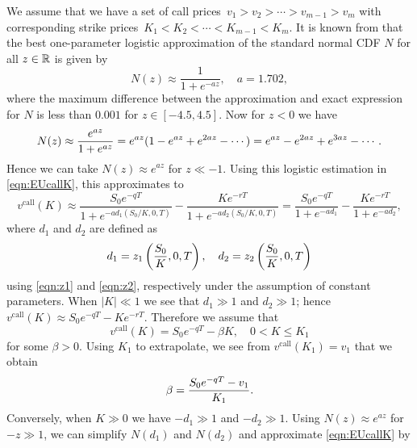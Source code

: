 We assume that we have a set of call prices~$v_1 > v_2 > \cdots > v_{m - 1} > v_m$ with corresponding strike prices~$K_1 < K_2 < \cdots < K_{m - 1} < K_m$. It is known from \cite{Bowling2009} that the best one-parameter logistic approximation of the standard normal CDF $N$ for all $z \in \mathbb R$ is given by
	\begin{equation*}
		N(z) \approx \frac{1}{1 + e^{-a z}}, \quad a = 1.702,
	\end{equation*}
where the maximum difference between the approximation and exact expression for $N$ is less than $0.001$ for $z \in [-4.5,4.5]$. %
Now for $z < 0$ we have
	\begin{equation*}
		N(z) \approx \frac{e^{az}}{1+e^{az}} = e^{az}(1-e^{az}+e^{2az}-\cdots) = e^{az} - e^{2az} + e^{3az} - \cdots.
	\end{equation*}
Hence we can take $N(z) \approx e^{az}$ for $z \ll -1$. Using this logistic estimation in \eqref{eqn:EUcallK}, this approximates to
	\begin{equation*}
		v^{\text{call}}(K) \approx \frac{S_0 e^{-q T}}{1 + e^{-a d_1(S_0/K,0,T)}} - \frac{K e^{-r T}}{1 + e^		{-a d_2(S_0/K,0,T)}} = \frac{S_0 e^{-q T}}{1 + e^{-a d_1}} - \frac{K e^{-r T}}{1 + e^		{-a d_2}},
	\end{equation*}
where $d_1$ and $d_2$ are defined as
	\begin{equation*}
		d_1 = z_1\left( \frac{S_0}{K},0,T \right), \quad d_2 = z_2\left( \frac{S_0}{K}, 0, T\right)
	\end{equation*}
using \eqref{eqn:z1} and \eqref{eqn:z2}, respectively under the assumption of constant parameters.
When $|K| \ll 1$ we see that $d_1 \gg 1$ and $d_2 \gg 1$; hence $v^{\text{call}}(K) \approx S_0 e^{-q T} - K e^{-r T}$. Therefore we assume that
	\begin{equation*}
		v^{\text{call}}(K) = S_0e^{-qT} - \beta K, \quad 0 < K \le K_1
	\end{equation*}
for some $\beta > 0$. Using $K_1$ to extrapolate, we see from $v^{\text{call}}(K_1) = v_1$ that we obtain
	\begin{equation*}
		\beta = \frac{S_0e^{-qT} - v_1}{K_1}.
	\end{equation*}
Conversely, when $K \gg 0$ we have $-d_1 \gg 1$ and $-d_2 \gg 1$. Using $N(z) \approx e^{az}$ for $-z \gg 1$, we can simplify $N(d_1)$ and $N(d_2)$ and approximate \eqref{eqn:EUcallK} by
